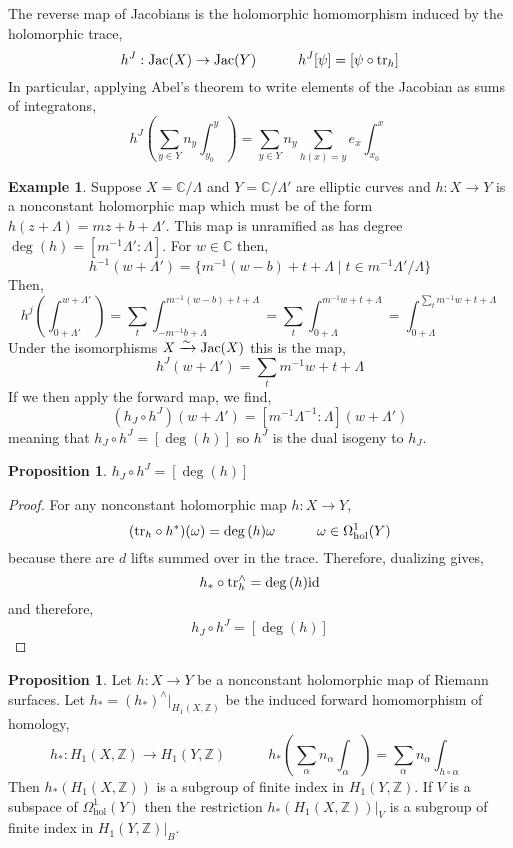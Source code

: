 \documentclass{article}
\newcommand{\Z}{\mathbb{Z}}
\newcommand{\C}{\mathbb{C}}
\newcommand{\id}{\mathrm{id}}
\theoremstyle{definition}
\newtheorem{proposition}[theorem]{Proposition}
\newtheorem{example}[theorem]{Example}
\newenvironment{definition}[1][Definition:]{\begin{trivlist}
\item[\hskip \labelsep {\bfseries #1}]}{\end{trivlist}}
\begin{document}
\begin{definition}
The reverse map of Jacobians is the holomorphic homomorphism induced by the holomorphic trace,
\[ h^J : \mathrm{Jac}(X) \to \mathrm{Jac}(Y) \quad \quad \quad h^J[\psi] = [\psi \circ \mathrm{tr}_h] \]
In particular, applying Abel's theorem to write elements of the Jacobian as sums of integratons,
\[ h^J \left( \sum_{y \in Y} n_y \int_{y_0}^y \right) = \sum_{y \in Y} n_y \sum_{h(x) = y} e_x \int_{x_0}^x \]
\end{definition}

\begin{example}
Suppose $X = \C / \Lambda$ and $Y = \C / \Lambda'$ are elliptic curves and $h : X \to Y$ is a nonconstant holomorphic map which must be of the form $h(z + \Lambda) = mz + b + \Lambda'$. This map is unramified as has degree $\deg{(h)} = [m^{-1} \Lambda' : \Lambda]$. For $w \in \C$ then,
\[ h^{-1}(w + \Lambda') = \{ m^{-1}(w - b) + t + \Lambda \mid t \in m^{-1} \Lambda' / \Lambda \} \]
Then,
\[ h^j \left( \int_{0 + \Lambda'}^{w + \Lambda'} \right) = \sum_{t} \int_{- m^{-1} b + \Lambda}^{m^{-1}(w - b) + t + \Lambda} = \sum_t \int_{0 + \Lambda}^{m^{-1} w + t + \Lambda} = \int_{0 + \Lambda}^{\sum_t m^{-1} w + t + \Lambda} \]
Under the isomorphisms $X \xrightarrow{\sim} \mathrm{Jac}(X)$ this is the map,
\[ h^J(w + \Lambda') = \sum_{t} m^{-1} w + t + \Lambda \]
If we then apply the forward map, we find,
\[ (h_J \circ h^J)(w + \Lambda') = [m^{-1} \Lambda^{-1} : \Lambda] (w + \Lambda') \]
meaning that $h_J \circ h^J = [\deg{(h)}]$ so $h^J$ is the dual isogeny to $h_J$. 
\end{example}

\begin{proposition}
$h_J \circ h^J = [\deg{(h)}]$
\end{proposition}

\begin{proof}
For any nonconstant holomorphic map $h : X \to Y$,
\[ (\mathrm{tr}_h \circ h^*)(\omega) = \deg{(h)} \omega \quad \quad \quad \omega \in \Omega^1_{\text{hol}}(Y) \]
because there are $d$ lifts summed over in the trace.
Therefore, dualizing gives,
\[ h_* \circ \tr_h^\wedge = \deg{(h)} \id \]
and therefore,
\[ h_J \circ h^J = [\deg{(h)}] \]
\end{proof}

\begin{proposition}
Let $h : X \to Y$ be a nonconstant holomorphic map of Riemann surfaces. Let $h_* = (h_*)^\wedge|_{H_1(X, \Z)}$ be the induced forward homomorphism of homology,
\[ h_* : H_1(X, \Z) \to H_1(Y, \Z) \quad \quad \quad h_* \left( \sum_\alpha n_\alpha \int_\alpha \right) = \sum_\alpha n_\alpha \int_{h \circ \alpha} \]
Then $h_*(H_1(X, \Z))$ is a subgroup of finite index in $H_1(Y, \Z)$. If $V$ is a subspace of $\Omega^1_{\text{hol}}(Y)$ then the restriction $h_*(H_1(X,\Z))|_V$ is a subgroup of finite index in $H_1(Y, \Z)|_B$. 
\end{proposition}
\end{document}
